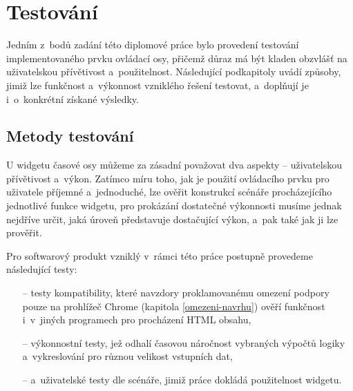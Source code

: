 \graphicspath{{text/testovani/img/}}

\chapter{Testování}
\label{testovani}
	Jedním z~bodů zadání této diplomové práce bylo provedení testování implementovaného prvku ovládací osy, přičemž důraz má být kladen obzvlášť na uživatelskou přívětivost a~použitelnost. Následující podkapitoly uvádí způsoby, jimiž lze funk\-čnost a~výkonnost vzniklého řešení testovat, a~doplňují je i~o~konkrétní získané výsledky.
	
	\section{Metody testování}
		U widgetu časové osy můžeme za zásadní považovat dva aspekty -- uživatelskou přívětivost a~výkon. Zatímco míru toho, jak je použití ovládacího prvku pro uživatele příjemné a~jednoduché, lze ověřit konstrukcí scénáře procháze\-jícího jednotlivé funkce widgetu, pro prokázání dostatečné výkon\-nosti musíme jednak nejdříve určit, jaká úroveň představuje dostačující výkon, a~pak také jak ji lze prověřit.
		
		Pro softwarový produkt vzniklý v~rámci této práce postupně provedeme násle\-dující testy:
		\begin{enumerate}
			\item[--] testy kompatibility, které navzdory proklamovanému omezení podpory pou\-ze na prohlí\-žeč {\sf Chrome} (kapitola \ref{omezeni-navrhu}) ověří funkčnost i~v~jiných programech pro procházení HTML obsahu,
			\item[--] výkonnostní testy, jež odhalí časovou náročnost vybraných výpočtů logiky a~vykreslování pro různou velikost vstupních dat,
			\item[--] a~uživatelské testy dle scénáře, jimiž práce dokládá použitelnost widgetu.
		\end{enumerate}
		
